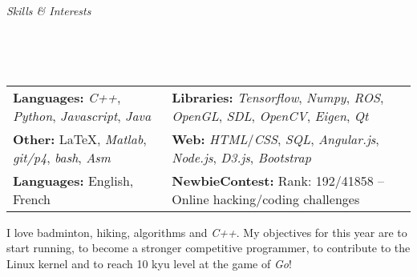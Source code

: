 \documentclass[a4paper, 12pt]{article}
\newcommand{\marginline}{-0.3cm}
\newcommand{\marginbeforesection}{0.25cm}
\newcommand{\marginmisc}{0.3cm}
\newcommand{\marginbeforemisc}{-0.75cm}
\newcommand{\linewidthperso}{0.02cm}
\newcommand{\stylesection}[1]{
  \vspace{\marginbeforesection}
  \begin{normalsize}\textit{#1}\end{normalsize}
  \vspace{\marginline}\\
  \noindent\makebox[\linewidth]{\rule{\textwidth}{\linewidthperso}}

}
\begin{document}
\begin{footnotesize}
\stylesection{Skills \& Interests}
~\\
\vspace{\marginbeforemisc}

\noindent\begin{tabular}{@{}p{7.15cm}p{12cm}}
  \textbf{Languages:} \textit{C++}, \textit{Python}, \textit{Javascript}, \textit{Java} & \textbf{Libraries:} \textit{Tensorflow}, \textit{Numpy}, \textit{ROS}, \textit{OpenGL}, \textit{SDL}, \textit{OpenCV}, \textit{Eigen}, \textit{Qt}\\
  \textbf{Other:} \LaTeX, \textit{Matlab}, \textit{git/p4}, \textit{bash}, \textit{Asm} & \textbf{Web:} \textit{HTML}/\textit{CSS}, \textit{SQL}, \textit{Angular.js}, \textit{Node.js}, \textit{D3.js}, \textit{Bootstrap}\\
  \textbf{Languages:} English, French & \textbf{NewbieContest:} Rank: 192/41858 -- Online hacking/coding challenges\\
\end{tabular}

\vspace{\marginmisc}

\renewcommand{\baselinestretch}{0.8}
I love badminton, hiking, algorithms and \textit{C++}. My objectives for this year are to start running, to become a stronger competitive programmer, to contribute to the Linux kernel and to reach 10 kyu level at the game of \textit{Go}!

\end{footnotesize}
\end{document}
